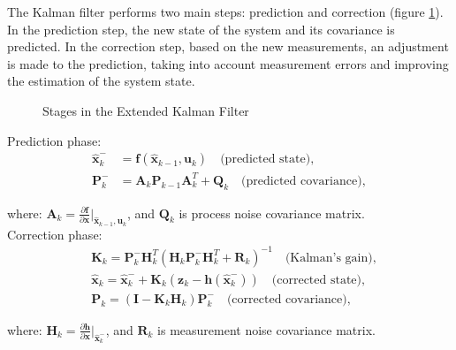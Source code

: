 The Kalman filter performs two main steps: prediction and correction (figure \ref{kf_diagram}). In the prediction step, the new state of the system and its covariance is predicted. In the correction step, based on the new measurements, an adjustment is made to the prediction, taking into account measurement errors and improving the estimation of the system state.

\begin{figure}[!h]
	\centering
	\caption{Stages in the Extended Kalman Filter}
	\label{kf_diagram}
\end{figure}

Prediction phase:
\begin{align}
	\bm{\hat{x}}_k^- & = \bm{f}(\bm{\hat{x}}_{k-1}, \bm{u}_k) \quad \text{(predicted state)}, \\
	\bm{P}_k^- & = \bm{A}_k \bm{P}_{k-1} \bm{A}_k^T + \bm{Q}_k \quad \text{(predicted covariance)},
\end{align}

where: $\bm{A}_k = \frac{\partial \bm{f}}{\partial \bm{x}}\Bigr|_{\bm{\hat{x}}_{k-1}, \bm{u}_k}$, and $\bm{Q}_k$ is process noise covariance matrix.\\

Correction phase:
\begin{align}
	&\bm{K}_k = \bm{P}_k^- \bm{H}_k^T (\bm{H}_k \bm{P}_k^- \bm{H}_k^T + \bm{R}_k)^{-1} \quad \text{(Kalman's gain)}, \\
	&\bm{\hat{x}}_k = \bm{\hat{x}}_k^- + \bm{K}_k(\bm{\bm{z}}_k - \bm{h}(\bm{\hat{x}}_k^-)) \quad \text{(corrected state)}, \\
	&\bm{P}_k = (\bm{I} - \bm{K}_k \bm{H}_k) \bm{P}_k^- \quad \text{(corrected covariance)},
\end{align}

where: $\bm{H}_k = \frac{\partial \bm{h}}{\partial \bm{x}}\Bigr|_{\bm{\hat{x}}_k^-}$, and $\bm{R}_k$ is measurement noise covariance matrix.


